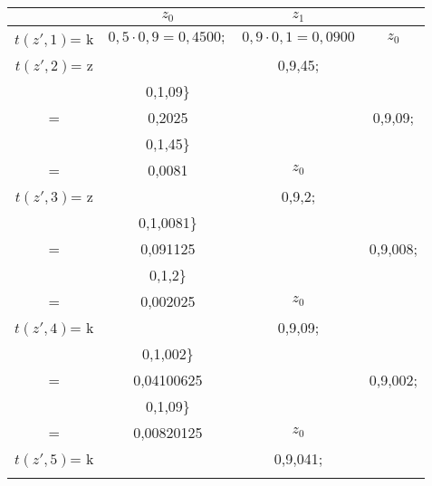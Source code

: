 \begin{center}
\begin{tabular}{cccc}
				& \(z_{0}\) & \(z_{1}\) & \\ \hline
\(t(z',1)\)= k	& \(0,5\cdot0,9 = 0,4500;\) & \(0,9\cdot0,1 = 0,0900\) & \(z_{0}\) \\ \hline
\(t(z',2)\)= z	& \(	\begin{array} {r@{}l@{}}
							0,5\cdot\max\{	& 0,9\cdot0,45; \\
											& 0,1\cdot0,09\}\\
										   =& 0,2025
					\end{array}
					\)
				&  \(	\begin{array} {r@{}l@{}}
							0,1\cdot\max\{	& 0,9\cdot0,09; \\
											& 0,1\cdot0,45\}\\
										   =& 0,0081
					\end{array}
					\) & \(z_{0}\) \\ \hline
\(t(z',3)\)= z	& \(	\begin{array} {r@{}l@{}}
							0,5\cdot\max\{	& 0,9\cdot0,2; \\
											& 0,1\cdot0,0081\}\\
										   =& 0,091125
					\end{array}
					\))
				&   \(	\begin{array} {r@{}l@{}}
							0,1\cdot\max\{	& 0,9\cdot0,008; \\
											& 0,1\cdot0,2\}\\
										   =& 0,002025
					\end{array}
					\) & \(z_{0}\)\\ \hline
\(t(z',4)\)= k	& \(	\begin{array} {r@{}l@{}}
							0,5\cdot\max\{	& 0,9\cdot0,09; \\
											& 0,1\cdot0,002\}\\
										   =& 0,04100625
					\end{array}
					\)
				&   \(	\begin{array} {r@{}l@{}}
							0,9\cdot\max\{	& 0,9\cdot0,002; \\
											& 0,1\cdot0,09\}\\
										   =& 0,00820125
					\end{array}
					\) & \(z_{0}\)\\ \hline
\(t(z',5)\)= k	& \(	\begin{array} {r@{}l@{}}
							0,5\cdot\max\{	& 0,9\cdot0,041; \\

\end{array}
\end{tabular}
\end{center}

